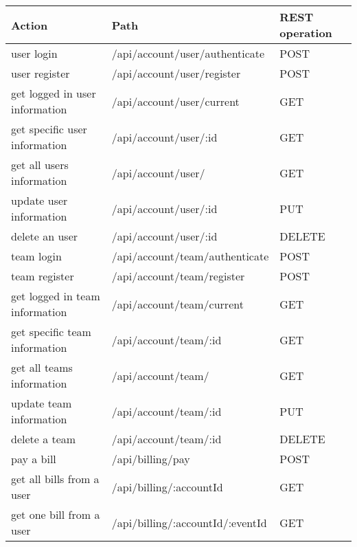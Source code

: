\begin{table}
    \centering
    \begin{tabular}{ |l|l|l| }
        \hline
        Action                         & Path                             & REST operation \\
        \hline
        user login                     & /api/account/user/authenticate   & POST           \\
        user register                  & /api/account/user/register       & POST           \\
        get logged in user information & /api/account/user/current        & GET            \\
        get specific user information  & /api/account/user/:id            & GET            \\
        get all users information      & /api/account/user/               & GET            \\
        update user information        & /api/account/user/:id            & PUT            \\
        delete an user                 & /api/account/user/:id            & DELETE         \\
        team login                     & /api/account/team/authenticate   & POST           \\
        team register                  & /api/account/team/register       & POST           \\
        get logged in team information & /api/account/team/current        & GET            \\
        get specific team information  & /api/account/team/:id            & GET            \\
        get all teams information      & /api/account/team/               & GET            \\
        update team information        & /api/account/team/:id            & PUT            \\
        delete a team                  & /api/account/team/:id            & DELETE         \\
        \hline
        pay a bill                     & /api/billing/pay                 & POST           \\
        get all bills from a user      & /api/billing/:accountId          & GET            \\
        get one bill from a user       & /api/billing/:accountId/:eventId & GET            \\
        \hline

\end{tabular}
\end{table}
